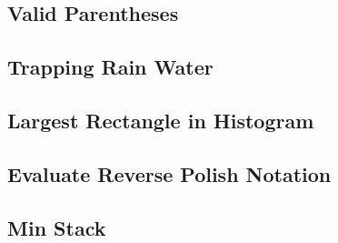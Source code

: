     
\subsection{Valid Parentheses}

\subsection{Trapping Rain Water}

\subsection{Largest Rectangle in Histogram}

\subsection{Evaluate Reverse Polish Notation}

\subsection{Min Stack}

